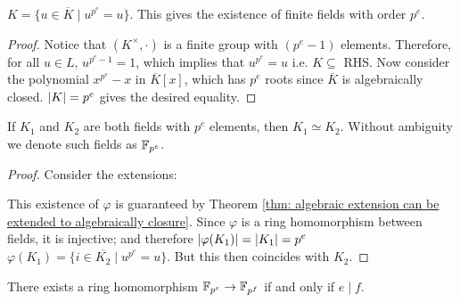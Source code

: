 \documentclass{article}
\begin{document}
\begin{claim}\label{clm: fields with p^e elements}
    $K = \{u \in \overline{K} \mid u^{p^e} = u\}$. This gives the existence of finite fields with order $p^e$.
\end{claim}

\begin{proof}
    Notice that $(K^{\times}, \cdot)$ is a finite group with $(p^e - 1)$ elements. Therefore, for all $u \in L$, $u^{p^e - 1} = 1$, which implies that $u^{p^e} = u$ i.e. $K \subseteq $ RHS. Now consider the polynomial $x^{p^e} - x$ in $\overline{K}[x]$, which has $p^e$ roots since $\overline{K}$ is algebraically closed. $\left|K\right| = p^e$ gives the desired equality.
\end{proof}

\begin{proposition}\label{prop: F_pe are isomorphic}
    If $K_1$ and $K_2$ are both fields with $p^e$ elements, then $K_1 \simeq K_2$. Without ambiguity we denote such fields as $\mathbb{F}_{p^e}$.
\end{proposition}

\begin{proof}
    Consider the extensions:

    \begin{minipage}{\linewidth}
        \centering
    \end{minipage}

    This existence of $\varphi$ is guaranteed by Theorem \ref{thm: algebraic extension can be extended to algebraically closure}. Since $\varphi$ is a ring homomorphism between fields, it is injective; and therefore $\left|\varphi(K_1)\right| = \left|K_1\right| = p^e$ \implies $\varphi(K_1) = \{i \in \overline{K_2} \mid u^{p^e} = u\}$. But this then coincides with $K_2$.
\end{proof}

\begin{example}\label{ex: f_pe extends to f_pf iff e divides f}
    There exists a ring homomorphism $\mathbb{F}_{p^e} \to \mathbb{F}_{p^f}$ if and only if $e \mid f$. 
\end{example}
    
\end{document}
